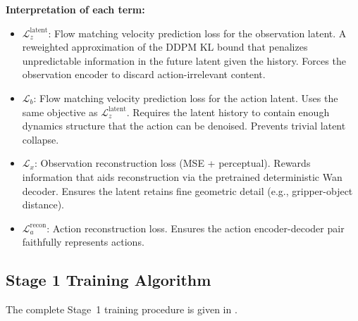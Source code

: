\documentclass{article}
\newcommand{\loss}{\mathcal{L}}
\begin{document}
\textbf{Interpretation of each term:}
\begin{itemize}[leftmargin=*,itemsep=2pt]
  \item $\loss_z^{\text{latent}}$: Flow matching velocity prediction loss for the observation latent. A reweighted approximation of the DDPM KL bound that penalizes unpredictable information in the future latent given the history. Forces the observation encoder to discard action-irrelevant content.
  \item $\loss_b$: Flow matching velocity prediction loss for the action latent. Uses the same objective as $\loss_z^{\text{latent}}$. Requires the latent history to contain enough dynamics structure that the action can be denoised. Prevents trivial latent collapse.
  \item $\loss_x$: Observation reconstruction loss (MSE + perceptual). Rewards information that aids reconstruction via the pretrained deterministic Wan decoder. Ensures the latent retains fine geometric detail (e.g., gripper-object distance).
  \item $\loss_a^{\text{recon}}$: Action reconstruction loss. Ensures the action encoder-decoder pair faithfully represents actions.
\end{itemize}

\subsection{Stage 1 Training Algorithm}
\label{sec:stage1_algo}

The complete Stage~1 training procedure is given in .
\end{document}
